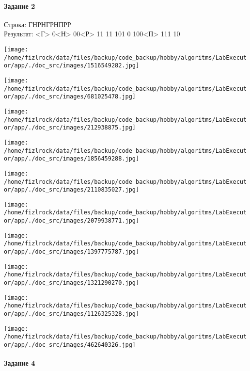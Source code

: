 \documentclass[a4paper, 12pt]{article}
\begin{document}
\paragraph{Задание 2}

Строка: 
ГНРНГРНПРР\\
Результат: <Г> 0<Н> 00<Р> 11 11 101 0 100<П> 111 10

\texttt{[image: /home/fizlrock/data/files/backup/code\_backup/hobby/algoritms/LabExecutor/app/./doc\_src/images/1516549282.jpg]}

\texttt{[image: /home/fizlrock/data/files/backup/code\_backup/hobby/algoritms/LabExecutor/app/./doc\_src/images/681025478.jpg]}

\texttt{[image: /home/fizlrock/data/files/backup/code\_backup/hobby/algoritms/LabExecutor/app/./doc\_src/images/212938875.jpg]}

\texttt{[image: /home/fizlrock/data/files/backup/code\_backup/hobby/algoritms/LabExecutor/app/./doc\_src/images/1856459288.jpg]}

\texttt{[image: /home/fizlrock/data/files/backup/code\_backup/hobby/algoritms/LabExecutor/app/./doc\_src/images/2110835027.jpg]}

\texttt{[image: /home/fizlrock/data/files/backup/code\_backup/hobby/algoritms/LabExecutor/app/./doc\_src/images/2079938771.jpg]}

\texttt{[image: /home/fizlrock/data/files/backup/code\_backup/hobby/algoritms/LabExecutor/app/./doc\_src/images/1397775787.jpg]}

\texttt{[image: /home/fizlrock/data/files/backup/code\_backup/hobby/algoritms/LabExecutor/app/./doc\_src/images/1321290270.jpg]}

\texttt{[image: /home/fizlrock/data/files/backup/code\_backup/hobby/algoritms/LabExecutor/app/./doc\_src/images/1126325328.jpg]}

\texttt{[image: /home/fizlrock/data/files/backup/code\_backup/hobby/algoritms/LabExecutor/app/./doc\_src/images/462640326.jpg]}
\pagebreak
\paragraph{Задание 4}
\end{document}
